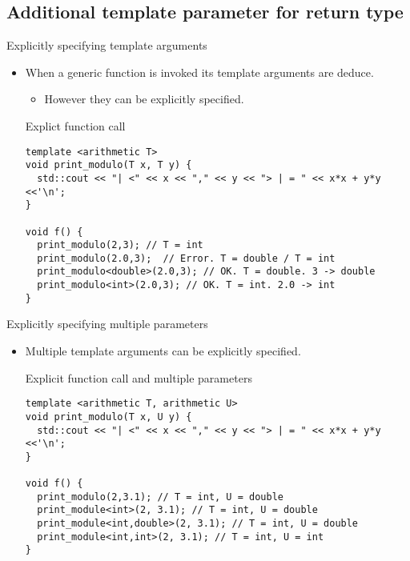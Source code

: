 \subsection{Additional template parameter for return type}

\begin{frame}[t,fragile]{Explicitly specifying template arguments}
\begin{itemize}
  \item When a generic function is invoked its template arguments are deduce.
    \begin{itemize}
      \item However they can be explicitly specified.
    \end{itemize}

\begin{block}{Explict function call}
\begin{lstlisting}
template <arithmetic T>
void print_modulo(T x, T y) {
  std::cout << "| <" << x << "," << y << "> | = " << x*x + y*y <<'\n';
}

void f() {
  print_modulo(2,3); // T = int
  print_modulo(2.0,3);  // Error. T = double / T = int
  print_modulo<double>(2.0,3); // OK. T = double. 3 -> double
  print_modulo<int>(2.0,3); // OK. T = int. 2.0 -> int
}

\end{lstlisting}
\end{block}

\end{itemize}
\end{frame}

\begin{frame}[t,fragile]{Explicitly specifying multiple parameters}
\begin{itemize}
  \item Multiple template arguments can be explicitly specified.

\begin{block}{Explicit function call and multiple parameters}
\begin{lstlisting}
template <arithmetic T, arithmetic U>
void print_modulo(T x, U y) {
  std::cout << "| <" << x << "," << y << "> | = " << x*x + y*y <<'\n';
}

void f() {
  print_modulo(2,3.1); // T = int, U = double
  print_module<int>(2, 3.1); // T = int, U = double
  print_module<int,double>(2, 3.1); // T = int, U = double
  print_module<int,int>(2, 3.1); // T = int, U = int
}
\end{lstlisting}
\end{block}

\end{itemize}
\end{frame}

